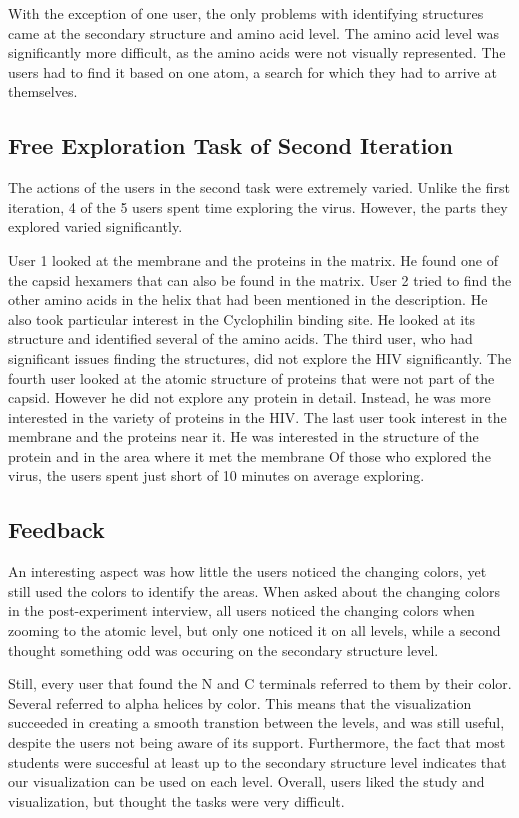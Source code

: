 \documentclass[review,journal]{vgtc}         %
\begin{document}
With the exception of one user, the only problems with identifying structures came at the secondary structure and amino acid level. 
The amino acid level was significantly more difficult, as the amino acids were not visually represented. 
The users had to find it based on one atom, a search for which they had to arrive at themselves. 



\subsection{Free Exploration Task of Second Iteration}

The actions of the users in the second task were extremely varied. 
Unlike the first iteration, 4 of the 5 users spent time exploring the virus. 
However, the parts they explored varied significantly. 

User 1 looked at the membrane and the proteins in the matrix. 
He found one of the capsid hexamers that can also be found in the matrix.
User 2 tried to find the other amino acids in the helix that had been mentioned in the description. 
He also took particular interest in the Cyclophilin binding site. 
He looked at its structure and identified several of the amino acids.
The third user, who had significant issues finding the structures, did not explore the HIV significantly.
The fourth user looked at the atomic structure of proteins that were not part of the capsid.
However he did not explore any protein in detail. 
Instead, he was more interested in the variety of proteins in the HIV.
The last user took interest in the membrane and the proteins near it.
He was interested in the structure of the protein and in the area where it met the membrane
Of those who explored the virus, the users spent just short of 10 minutes on average exploring.




\subsection{Feedback}
An interesting aspect was how little the users noticed the changing colors, yet still used the colors to identify the areas.
When asked about the changing colors in the post-experiment interview, all users noticed the changing colors when zooming to the atomic level, but only one noticed it on all levels, while a second thought something odd was occuring on the secondary structure level. 
 
Still, every user that found the N and C terminals referred to them by their color. 
Several referred to alpha helices by color. 
This means that the visualization succeeded in creating a smooth transtion between the levels, and was still useful, despite the users not being aware of its support. 
Furthermore, the fact that most students were succesful at least up to the secondary structure level indicates that our visualization can be used on each level. 
Overall, users liked the study and visualization, but thought the tasks were very difficult.
\end{document}
